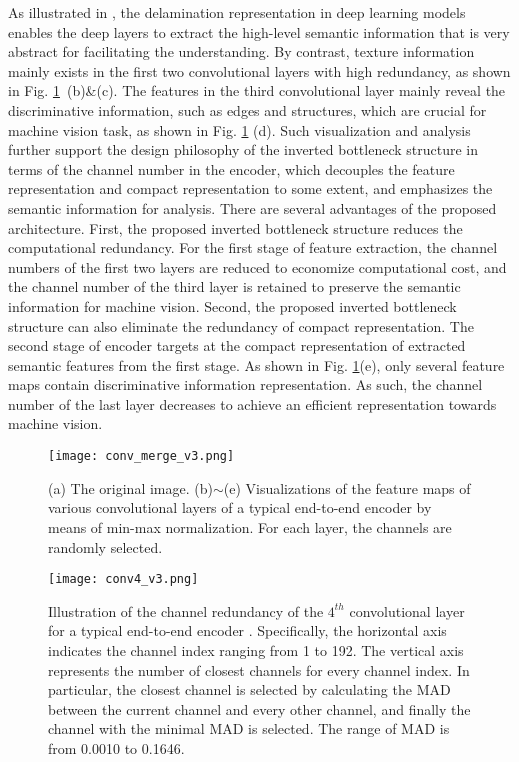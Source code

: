 \documentclass[transmag]{IEEEtran}
\begin{document}
As illustrated in \cite{zeiler2014visualizing, he2016deep}, the delamination representation in deep learning models enables the deep layers to extract the high-level semantic information that is very abstract for facilitating the understanding. By contrast, texture information mainly exists in the first two convolutional layers with high redundancy, as shown in Fig. \ref{feature}~(b)\&(c). The features in the third convolutional layer mainly reveal the discriminative information, such as edges and structures, which are crucial for machine vision task, as shown in Fig. \ref{feature} (d). 
Such visualization and analysis further support the design philosophy of the inverted bottleneck structure in terms of the channel number in the encoder, which decouples the feature representation and compact representation to some extent, and emphasizes the semantic information for analysis. There are several advantages of the proposed architecture. First, the proposed inverted bottleneck structure reduces the computational redundancy. 
For the first stage of feature extraction, the channel numbers of the first two layers are reduced to economize computational cost, and the channel number of the third layer is retained to preserve the semantic information for machine vision. Second, the proposed inverted bottleneck structure can also eliminate the redundancy of compact representation. The second stage of encoder targets at the compact representation of extracted semantic features from the first stage. As shown in Fig. \ref{feature}(e), only several feature maps contain discriminative information representation. As such, the channel number of the last layer decreases to achieve an efficient representation towards machine vision.

\begin{figure}[bt]
\centerline{\texttt{[image: conv\_merge\_v3.png]}}
\vspace{-2mm}
\caption{(a) The original image. (b)$\sim$(e) Visualizations of the feature maps of various convolutional layers of a typical end-to-end encoder \cite{minnen2018joint} by means of min-max normalization. For each layer, the channels are randomly selected.}
\label{feature}
\vspace{-4mm}
\end{figure}

\begin{figure}[bt]
\centerline{\texttt{[image: conv4\_v3.png]}}
\vspace{-2mm}
\caption{Illustration of the channel redundancy of the $4^{th}$ convolutional layer for a typical end-to-end encoder \cite{minnen2018joint}. %
Specifically, the horizontal axis indicates the channel index ranging from 1 to 192. The vertical axis represents the number of closest channels for every channel index. In particular, the closest channel is selected by calculating the MAD between the current channel and every other channel, and finally the channel with the minimal MAD is selected. The range of MAD is from 0.0010 to 0.1646.}
\label{conv4}
\vspace{-4mm}
\end{figure}
\end{document}
